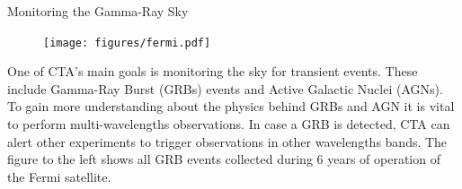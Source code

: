 \begin{multicols}{2}
    \begin{block}[]{Monitoring the Gamma-Ray Sky}%
      \begin{multicols}{2}
        \begin{figure}
          \texttt{[image: figures/fermi.pdf]}\\
        \end{figure}
        \columnbreak
        One of CTA's main goals is monitoring the sky for transient events. These include Gamma-Ray Burst (GRBs) events and
        Active Galactic Nuclei (AGNs).
        To gain more understanding about the physics behind GRBs and AGN it is vital to perform multi-wavelengths observations.
        In case a GRB is detected,  CTA can alert other experiments to trigger observations in other wavelengths bands.
        The figure to the left shows all GRB events collected during 6 years of operation of the Fermi satellite\cite{fermi}.
      \end{multicols}
    \end{block}%



\end{multicols}

